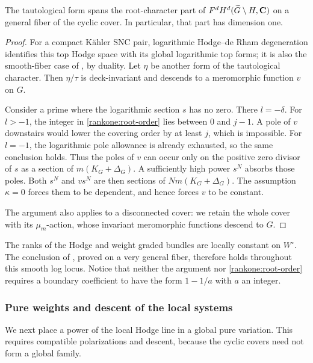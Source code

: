 \begin{lemma}\label{rankone:eigenspace}
The tautological form spans the root-character part of
$F^dH^d(\widetilde G\setminus H,\mathbf C)$ on a general fiber of the cyclic
cover.  In particular, that part has dimension one.
\end{lemma}

\begin{proof}
For a compact K\"ahler SNC pair, logarithmic Hodge--de Rham degeneration
identifies this top Hodge space with its global logarithmic top
forms; it is also the smooth-fiber case of
\cite[Theorem~1.1]{FujinoFujisawaVMHS}, by duality.  Let $\eta$ be
another form of the tautological character.  Then $\eta/\tau$ is
deck-invariant and descends to a meromorphic function $v$ on $G$.

Consider a prime where the logarithmic section $s$ has no zero.
There $l=-\delta$.  For $l>-1$, the integer in
\eqref{rankone:root-order} lies between $0$ and $j-1$.  A pole of
$v$ downstairs would lower the covering order by at least $j$, which
is impossible.  For $l=-1$, the logarithmic pole allowance is already
exhausted, so the same conclusion holds.  Thus the poles of $v$ can
occur only on the positive zero divisor of $s$ as a section of
$m(K_G+\Delta_G)$.  A sufficiently high power $s^N$ absorbs those
poles.  Both $s^N$ and $v s^N$ are then sections of
$Nm(K_G+\Delta_G)$.  The assumption $\kappa=0$ forces them to be
dependent, and hence forces $v$ to be constant.

The argument also applies to a disconnected cover: we retain the whole
cover with its $\mu_m$-action, whose invariant meromorphic functions
descend to $G$.
\end{proof}

The ranks of the Hodge and weight graded bundles are locally constant
on $W^\circ$.  The conclusion of , proved on
a very general fiber, therefore holds throughout this smooth log
locus.  Notice that neither the argument nor
\eqref{rankone:root-order} requires a boundary coefficient to have
the form $1-1/a$ with $a$ an integer.

\subsubsection{Pure weights and descent of the local systems}

We next place a power of the local Hodge line in a global pure
variation.  This requires compatible polarizations and descent,
because the cyclic covers need not form a global family.

